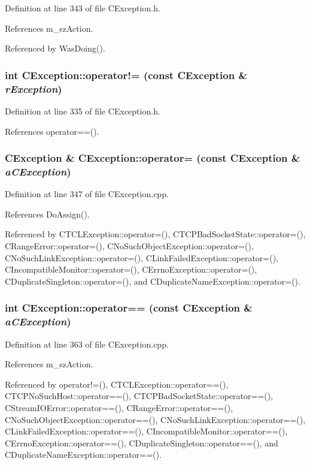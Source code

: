 Definition at line 343 of file CException.h.

References m\_\-sz\-Action.

Referenced by Was\-Doing().
\subsubsection{\setlength{\rightskip}{0pt plus 5cm}int CException::operator!= (const CException \& {\em r\-Exception})\hspace{0.3cm}{\tt  [inline]}}\label{classCException_a6}




Definition at line 335 of file CException.h.

References operator==().
\subsubsection{\setlength{\rightskip}{0pt plus 5cm}CException \& CException::operator= (const CException \& {\em a\-CException})}\label{classCException_a4}




Definition at line 347 of file CException.cpp.

References Do\-Assign().

Referenced by CTCLException::operator=(), CTCPBad\-Socket\-State::operator=(), CRange\-Error::operator=(), CNo\-Such\-Object\-Exception::operator=(), CNo\-Such\-Link\-Exception::operator=(), CLink\-Failed\-Exception::operator=(), CIncompatible\-Monitor::operator=(), CErrno\-Exception::operator=(), CDuplicate\-Singleton::operator=(), and CDuplicate\-Name\-Exception::operator=().
\subsubsection{\setlength{\rightskip}{0pt plus 5cm}int CException::operator== (const CException \& {\em a\-CException})}\label{classCException_a5}




Definition at line 363 of file CException.cpp.

References m\_\-sz\-Action.

Referenced by operator!=(), CTCLException::operator==(), CTCPNo\-Such\-Host::operator==(), CTCPBad\-Socket\-State::operator==(), CStream\-IOError::operator==(), CRange\-Error::operator==(), CNo\-Such\-Object\-Exception::operator==(), CNo\-Such\-Link\-Exception::operator==(), CLink\-Failed\-Exception::operator==(), CIncompatible\-Monitor::operator==(), CErrno\-Exception::operator==(), CDuplicate\-Singleton::operator==(), and CDuplicate\-Name\-Exception::operator==().
